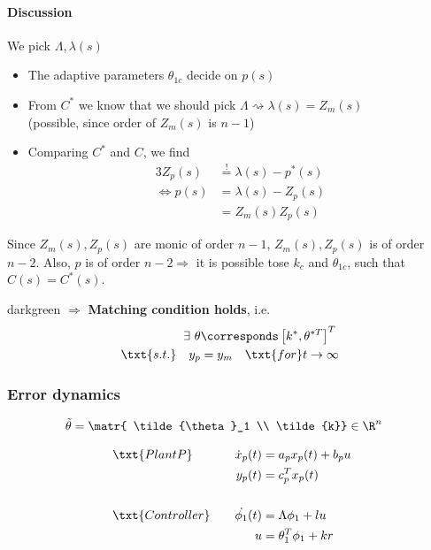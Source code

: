 \paragraph{Discussion}
We pick $\Lambda, \lambda(s)$ 
\begin{itemize}
\item The adaptive parameters $\theta_{1c}$ decide on $p(s)$
\item From $C^*$ we know that we should pick
    $\Lambda \rightsquigarrow \lambda(s) = Z_m(s)$\\
    (possible, since order of $Z_m(s)$ is $n-1 $)
\item Comparing $C^*$ and $C$, we find
\begin{alignat*}{3}
Z_p(s) &\overset{!}{=} \lambda(s) - p^*(s)\\
\Leftrightarrow p(s) &= \lambda(s) - Z_p(s)\\
    &= Z_m(s) Z_p(s)
\end{alignat*}
\end{itemize}

Since $Z_m(s), Z_p(s)$ are monic of order $n-1$,
$Z_m(s), Z_p(s)$ is of order $n-2$.
Also,  $p$ is of order $n-2 \Rightarrow$
it is possible tose $k_c$ and $\theta_{1c}$,
such that $C(s) = C^*(s)$.\\

\begin{conclusion}{darkgreen}
$\Rightarrow$ \textbf{Matching condition holds}, i.e.
\begin{alignat*}{3}
\exists ~ \theta &\corresponds \left[ k^*, \theta^{*T} \right]^T\\
\txt{s.t.} \quad  y_p &= y_m \quad \txt{for } t \rightarrow \infty
\end{alignat*}
\end{conclusion}

\subsubsection*{Error dynamics}
\begin{alignat*}{3}
\tilde{\theta} &= \matr{ \tilde{\theta}_1 \\ \tilde{k}}
    \in \R^n
\end{alignat*}

\begin{alignat*}{3}
&\txt{Plant P} \quad  &
    \dot{x}_p(t) &= a_p x_p(t) + b_p u\\
    && y_p(t) &= c_p^T x_p(t)\\
~\\
&\txt{Controller}  \quad &
    \dot{ \phi_1}(t) &= \Lambda \phi_1 + lu\\
    && u &= \theta_1^T \phi_1 + kr
\end{alignat*}

